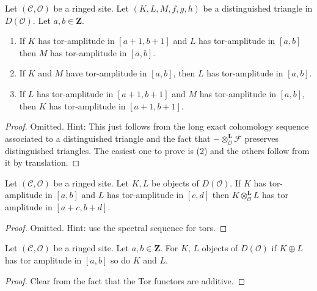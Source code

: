 \begin{lemma}
\label{lemma-cone-tor-amplitude}
Let $(\mathcal{C}, \mathcal{O})$ be a ringed site.
Let $(K, L, M, f, g, h)$ be a distinguished
triangle in $D(\mathcal{O})$. Let $a, b \in \mathbf{Z}$.
\begin{enumerate}
\item If $K$ has tor-amplitude in $[a + 1, b + 1]$ and
$L$ has tor-amplitude in $[a, b]$ then $M$ has
tor-amplitude in $[a, b]$.
\item If $K$ and $M$ have tor-amplitude in $[a, b]$, then
$L$ has tor-amplitude in $[a, b]$.
\item If $L$ has tor-amplitude in $[a + 1, b + 1]$
and $M$ has tor-amplitude in $[a, b]$, then
$K$ has tor-amplitude in $[a + 1, b + 1]$.
\end{enumerate}
\end{lemma}

\begin{proof}
Omitted. Hint: This just follows from the long exact cohomology sequence
associated to a distinguished triangle and the fact that
$- \otimes_\mathcal{O}^{\mathbf{L}} \mathcal{F}$
preserves distinguished triangles.
The easiest one to prove is (2) and the others follow from it by
translation.
\end{proof}

\begin{lemma}
\label{lemma-tensor-tor-amplitude}
Let $(\mathcal{C}, \mathcal{O})$ be a ringed site. Let $K, L$ be objects of
$D(\mathcal{O})$. If $K$ has tor-amplitude in $[a, b]$ and
$L$ has tor-amplitude in $[c, d]$ then $K \otimes_\mathcal{O}^\mathbf{L} L$
has tor amplitude in $[a + c, b + d]$.
\end{lemma}

\begin{proof}
Omitted. Hint: use the spectral sequence for tors.
\end{proof}

\begin{lemma}
\label{lemma-summands-tor-amplitude}
Let $(\mathcal{C}, \mathcal{O})$ be a ringed site. Let $a, b \in \mathbf{Z}$.
For $K$, $L$ objects of $D(\mathcal{O})$ if $K \oplus L$ has tor
amplitude in $[a, b]$ so do $K$ and $L$.
\end{lemma}

\begin{proof}
Clear from the fact that the Tor functors are additive.
\end{proof}

